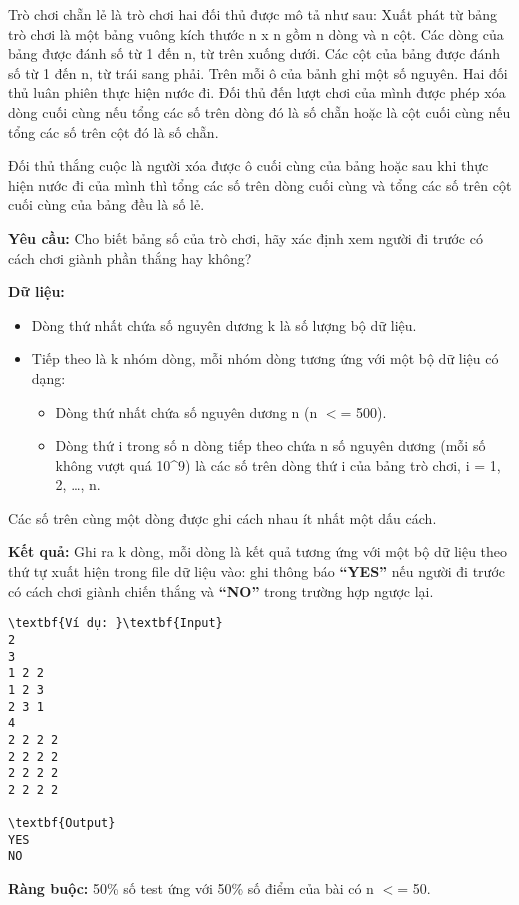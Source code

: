

Trò chơi chẵn lẻ là trò chơi hai đối thủ được mô tả như sau: Xuất phát từ bảng trò chơi là một bảng vuông kích thước n x n gồm n dòng và n cột. Các dòng của bảng được đánh số từ 1 đến n, từ trên xuống dưới. Các cột của bảng được đánh số từ 1 đến n, từ trái sang phải. Trên mỗi ô của bảnh ghi một số nguyên. Hai đối thủ luân phiên thực hiện nước đi. Đối thủ đến lượt chơi của mình được phép xóa dòng cuối cùng nếu tổng các số trên dòng đó là số chẵn hoặc là cột cuối cùng nếu tổng các số trên cột đó là số chẵn.

Đối thủ thắng cuộc là người xóa được ô cuối cùng của bảng hoặc sau khi thực hiện nước đi của mình thì tổng các số trên dòng cuối cùng và tổng các số trên cột cuối cùng của bảng đều là số lẻ.

\textbf{Yêu cầu: } Cho biết bảng số của trò chơi, hãy xác định xem người đi trước có cách chơi giành phần thắng hay không?

\textbf{Dữ liệu: }
\begin{itemize}
	\item Dòng thứ nhất chứa số nguyên dương k là số lượng bộ dữ liệu.
	\item Tiếp theo là k nhóm dòng, mỗi nhóm dòng tương ứng với một bộ dữ liệu có dạng:
\begin{itemize}
	\item Dòng thứ nhất chứa số nguyên dương n (n $<$= 500).
	\item Dòng thứ i trong số n dòng tiếp theo chứa n số nguyên dương (mỗi số không vượt quá 10\textasciicircum9) là các số trên dòng thứ i của bảng trò chơi, i = 1, 2, …, n.
\end{itemize}
\end{itemize}

Các số trên cùng một dòng được ghi cách nhau ít nhất một dấu cách.

\textbf{Kết quả: } Ghi ra k dòng, mỗi dòng là kết quả tương ứng với một bộ dữ liệu theo thứ tự xuất hiện trong file dữ liệu vào: ghi thông báo \textbf{ “YES” } nếu người đi trước có cách chơi giành chiến thắng và \textbf{ “NO” } trong trường hợp ngược lại.
\begin{verbatim}
\textbf{Ví dụ: }\textbf{Input}
2
3
1 2 2
1 2 3
2 3 1
4
2 2 2 2
2 2 2 2
2 2 2 2
2 2 2 2

\textbf{Output}
YES
NO\end{verbatim}

\textbf{Ràng buộc: } 50\% số test ứng với 50\% số điểm của bài có n $<$= 50.